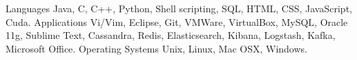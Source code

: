 \begin{cventries}
  \cventry
    {Languages}
    {}
    {}
    {}
    {Java, C, C++, Python, Shell scripting, SQL, HTML, CSS, JavaScript, Cuda.}
  \cventry
    {Applications}
    {}
    {}
    {}
    {Vi/Vim, Eclipse, Git, VMWare, VirtualBox, 
MySQL, Oracle 11g, Sublime Text, Cassandra, Redis, Elasticsearch, Kibana, Logstash, Kafka, Microsoft Office.}
\cventry
    {Operating Systems}
    {}
    {}
    {}
    {Unix, Linux, Mac OSX, Windows.}
\end{cventries}

